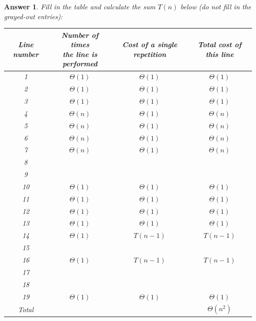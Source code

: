 \documentclass[a4paper]{article}
\theoremstyle{remarksStyle}
\theoremstyle{questionStyle}
\theoremstyle{answerStyle}
\newtheorem{answer}{Answer}
\begin{document}
\begin{answer}
    Fill in the table and calculate the sum $T(n)$ below (do not fill in the grayed-out entries):
\begin{center}    
\begin{tabular}{||c | c | c | c ||} 
 \hline
 Line number & \makecell{Number of times \\ the line is performed} & Cost of a single repetition & Total cost of this line \\ [0.5ex] 
 \hline\hline
 1 & $\Theta(1)$ & $\Theta(1)$ & $\Theta (1)$  \\ 
 \hline
 2 & $\Theta(1)$& $\Theta(1)$& $\Theta(1)$ \\
 \hline
 3 & $\Theta(1)$ &$\Theta(1)$ & $\Theta(1)$\\ 
  \hline
 4 &$\Theta(n)$ &$\Theta(1)$ &$\Theta(n)$ \\ 
   \hline
 5 &$\Theta(n)$ &$\Theta(1)$ &$\Theta(n)$ \\ 
  \hline
 6 &$\Theta(n)$ &$\Theta(1)$ &$\Theta(n)$ \\ 
    \hline
 7 &$\Theta(n)$ &$\Theta(1)$ &$\Theta(n)$ \\ 
 \hline
 8 & \cellcolor{Gray} & \cellcolor{Gray} & \cellcolor{Gray} \\ 
 \hline
 9 & \cellcolor{Gray} & \cellcolor{Gray} & \cellcolor{Gray} \\ 
 \hline
 10 & $\Theta(1)$ & $\Theta(1)$ & $\Theta (1)$  \\
 \hline
 11 & $\Theta(1)$ & $\Theta(1)$ & $\Theta (1)$  \\
 \hline
 12 & $\Theta(1)$ & $\Theta(1)$ & $\Theta (1)$  \\
 \hline
 13 & $\Theta(1)$ & $\Theta(1)$ & $\Theta (1)$  \\
 \hline
  14 & $\Theta(1)$ & $T(n-1)$ & $T(n-1)$\\  
 \hline
 15 & \cellcolor{Gray} & \cellcolor{Gray} & \cellcolor{Gray} \\ 
 \hline
     16  & $\Theta(1)$ & $T(n-1)$ & $T(n-1)$\\  
 \hline
 17 & \cellcolor{Gray} & \cellcolor{Gray} & \cellcolor{Gray} \\
 \hline
 18 & \cellcolor{Gray} & \cellcolor{Gray} & \cellcolor{Gray} \\
 \hline
 19 & $\Theta(1)$ & $\Theta(1)$ & $\Theta (1)$  \\ 
 \hline
 Total & \cellcolor{Gray} & \cellcolor{Gray} & $\Theta (n^2)$  \\ 
 \hline
\end{tabular}

\end{center}
\end{answer}
\end{document}
